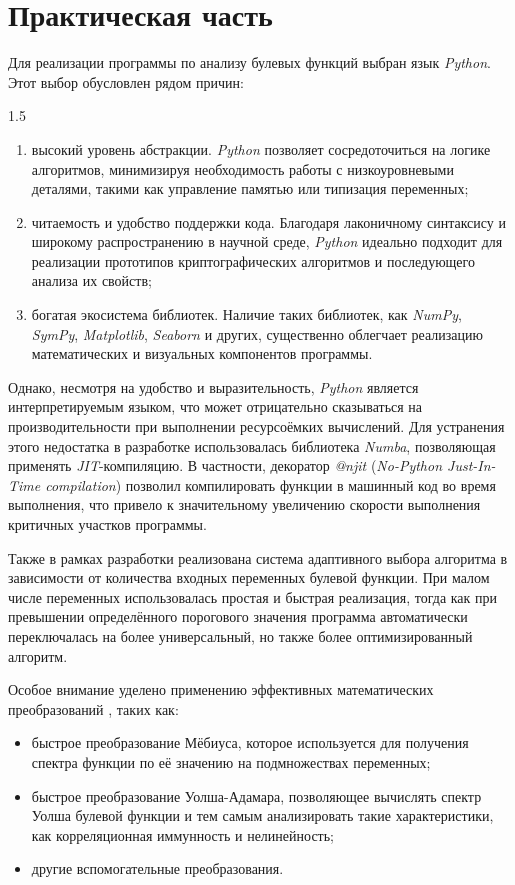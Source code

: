 \section{Практическая часть}
Для реализации программы по анализу булевых функций выбран язык \textit{Python}. Этот выбор обусловлен рядом причин:
\begin{spacing}{1.5}
\begin{enumerate}[label=\arabic*), itemsep=0em]
    \item высокий уровень абстракции. \textit{Python} позволяет сосредоточиться на логике алгоритмов, минимизируя необходимость работы с низкоуровневыми деталями, такими как управление памятью или типизация переменных;
    
    \item читаемость и удобство поддержки кода. Благодаря лаконичному синтаксису и широкому распространению в научной среде, \textit{Python} идеально подходит для реализации прототипов криптографических алгоритмов и последующего анализа их свойств;
    
    \item богатая экосистема библиотек. Наличие таких библиотек, как \textit{NumPy}, \textit{SymPy}, \textit{Matplotlib}, \textit{Seaborn} и других, существенно облегчает реализацию математических и визуальных компонентов программы.
\end{enumerate}
\end{spacing}
Однако, несмотря на удобство и выразительность, \textit{Python} является интерпретируемым языком, что может отрицательно сказываться на производительности при выполнении ресурсоёмких вычислений. Для устранения этого недостатка в разработке использовалась библиотека \textit{Numba}, позволяющая применять \textit{JIT}-компиляцию. В частности, декоратор \textit{@njit} (\textit{No-Python Just-In-Time compilation}) позволил компилировать функции в машинный код во время выполнения, что привело к значительному увеличению скорости выполнения критичных участков программы.

Также в рамках разработки реализована система адаптивного выбора алгоритма в зависимости от количества входных переменных булевой функции. При малом числе переменных использовалась простая и быстрая реализация, тогда как при превышении определённого порогового значения программа автоматически переключалась на более универсальный, но также более оптимизированный алгоритм.

Особое внимание уделено применению эффективных математических преобразований \cite{Shaier}, таких как:
\begin{itemize}
    \item быстрое преобразование Мёбиуса, которое используется для получения спектра функции по её значению на подмножествах переменных;
    \item быстрое преобразование Уолша-Адамара, позволяющее вычислять спектр Уолша булевой функции и тем самым анализировать такие характеристики, как корреляционная иммунность и нелинейность;
    \item другие вспомогательные преобразования.
\end{itemize}

